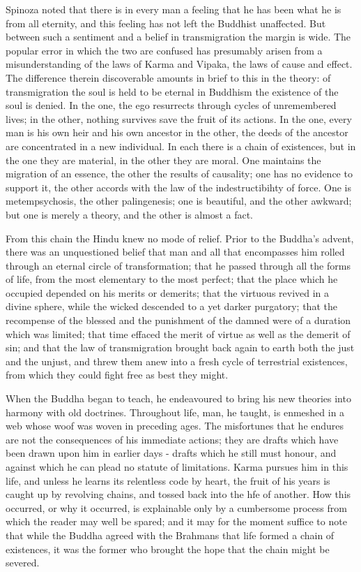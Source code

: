 \documentclass[]{book}
\begin{document}
Spinoza noted that there is in every man a feeling that he has been what
he is from all eternity, and this feeling has not left the Buddhist
unaffected. But between such a sentiment and a belief in transmigration
the margin is wide. The popular error in which the two are confused has
presumably arisen from a misunderstanding of the laws of Karma and
Vipaka, the laws of cause and effect. The difference therein
discoverable amounts in brief to this in the theory: of transmigration
the soul is held to be eternal in Buddhism the existence of the soul is
denied. In the one, the ego resurrects through cycles of unremembered
lives; in the other, nothing survives save the fruit of its actions. In
the one, every man is his own heir and his own ancestor in the other,
the deeds of the ancestor are concentrated in a new individual. In each
there is a chain of existences, but in the one they are material, in the
other they are moral. One maintains the migration of an essence, the
other the results of causality; one has no evidence to support it, the
other accords with the law of the indestructibihty of force. One is
metempsychosis, the other palingenesis; one is beautiful, and the other
awkward; but one is merely a theory, and the other is almost a fact.

From this chain the Hindu knew no mode of relief. Prior to the Buddha's
advent, there was an unquestioned belief that man and all that
encompasses him rolled through an eternal circle of transformation; that
he passed through all the forms of life, from the most elementary to the
most perfect; that the place which he occupied depended on his merits or
demerits; that the virtuous revived in a divine sphere, while the wicked
descended to a yet darker purgatory; that the recompense of the blessed
and the punishment of the damned were of a duration which was limited;
that time effaced the merit of virtue as well as the demerit of sin; and
that the law of transmigration brought back again to earth both the just
and the unjust, and threw them anew into a fresh cycle of terrestrial
existences, from which they could fight free as best they might.

When the Buddha began to teach, he endeavoured to bring his new theories
into harmony with old doctrines. Throughout life, man, he taught, is
enmeshed in a web whose woof was woven in preceding ages. The
misfortunes that he endures are not the consequences of his immediate
actions; they are drafts which have been drawn upon him in earlier days
- drafts which he still must honour, and against which he can plead no
statute of limitations. Karma pursues him in this life, and unless he
learns its relentless code by heart, the fruit of his years is caught up
by revolving chains, and tossed back into the hfe of another. How this
occurred, or why it occurred, is explainable only by a cumbersome
process from which the reader may well be spared; and it may for the
moment suffice to note that while the Buddha agreed with the Brahmans
that life formed a chain of existences, it was the former who brought
the hope that the chain might be severed.
\end{document}

